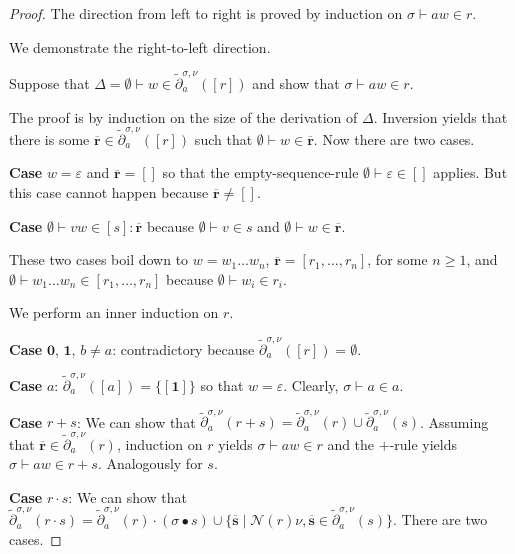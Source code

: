 \documentclass[runningheads, envcountsame, a4paper]{llncs}
\newcommand\cderiv[3][{}]{\tilde\partial^{#1}_{#3}(#2)}
\newcommand\Rnull{\mathbf0}
\newcommand\Rempty{\mathbf1}
\newcommand\PUSH{:}
\newcommand\SINGLETON[1]{{[#1]}}
\newcommand\Null{\mathcal{N}}
\newcommand\RS{\ensuremath{\overline{\mathbf{r}}}}
\renewcommand\SS{\ensuremath{\overline{\mathbf{s}}}}
\newcommand\ApplySubst[2]{#1 \bullet #2} %
\begin{document}
\begin{proof}
  The direction from left to right is proved by induction on  $\sigma
  \vdash aw \in r$. 

  We demonstrate the right-to-left direction. 

  Suppose that
  $\Delta = \emptyset \vdash w \in \cderiv[\sigma,\nu]{\SINGLETON r}a$ and show
  that
  $\sigma \vdash aw \in r$.

  The proof is by induction on the size of the derivation of $\Delta$. 
  Inversion yields that there is some $\RS \in
  \cderiv[\sigma,\nu]{\SINGLETON r}a$ such that $\emptyset \vdash w
  \in \RS$. Now there are two cases.

  \textbf{Case }$w=\varepsilon$ and $\RS=\SINGLETON{}$ so that the
  empty-sequence-rule $\emptyset \vdash \varepsilon \in \SINGLETON{}
  $ applies. But this case cannot happen because $\RS\ne\SINGLETON{}$.

  \textbf{Case }$\emptyset \vdash vw \in \SINGLETON{s}\PUSH\RS$
  because $\emptyset \vdash v \in s$ and $\emptyset \vdash w \in
  \RS$.

  These two cases boil down to $w=w_1\dots w_n$, $\RS = [r_1, \dots, r_n]$, for some $n\ge1$, and
  $\emptyset \vdash w_1\dots w_n \in [r_1, \dots, r_n]$ because
  $\emptyset \vdash w_i \in r_i$.

  We perform an inner induction on $r$.

  \textbf{Case }$\Rnull$, $\Rempty$, $b\ne a$: contradictory because
  $\cderiv[\sigma,\nu]{\SINGLETON r}a = \emptyset$.

  \textbf{Case }$a$: $\cderiv[\sigma,\nu]{\SINGLETON a}a =
  \{\SINGLETON\Rempty\}$ so that $w=\varepsilon$. Clearly, $\sigma
  \vdash a \in a$.

  \textbf{Case }$r+s$: We can show that $\cderiv[\sigma,\nu]{r+s}a =
  \cderiv[\sigma,\nu]{r}a \cup \cderiv[\sigma,\nu]{s}a$. Assuming that
  $\RS \in \cderiv[\sigma,\nu]{r}a$,  induction on
  $r$ yields $\sigma \vdash aw \in r$ and the $+$-rule yields  $\sigma
  \vdash aw \in r+s$. Analogously for $s$. 


  \textbf{Case }$r \cdot s$: We can show that
  $\cderiv[\sigma,\nu]{r\cdot s}a =
  \cderiv[\sigma,\nu]{r}a \cdot (\ApplySubst\sigma s) \cup \{ \SS
  \mid \Null (r)\nu, \SS \in \cderiv[\sigma,\nu]{s}a \}$. There are two cases.


\end{proof}
\end{document}
